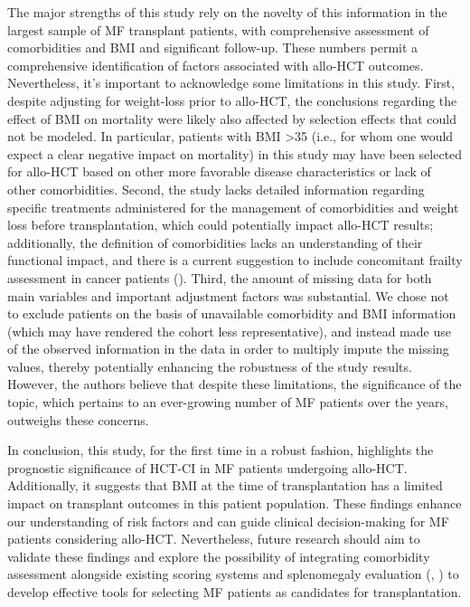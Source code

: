 \documentclass[
  letterpaper,
  paper=240mm:170mm,
  twoside=true,
  open=right,
  fontsize=10pt,
  pagesize=false,
  BCOR=15mm,
  DIV=14,
  headinclude=true,
  footinclude=false,
  headsepline=on]{scrbook}
\begin{document}
The major strengths of this study rely on the novelty of this
information in the largest sample of MF transplant patients, with
comprehensive assessment of comorbidities and BMI and significant
follow-up. These numbers permit a comprehensive identification of
factors associated with allo-HCT outcomes. Nevertheless, it's important
to acknowledge some limitations in this study. First, despite adjusting
for weight-loss prior to allo-HCT, the conclusions regarding the effect
of BMI on mortality were likely also affected by selection effects that
could not be modeled. In particular, patients with BMI \textgreater35
(i.e., for whom one would expect a clear negative impact on mortality)
in this study may have been selected for allo-HCT based on other more
favorable disease characteristics or lack of other comorbidities.
Second, the study lacks detailed information regarding specific
treatments administered for the management of comorbidities and weight
loss before transplantation, which could potentially impact allo-HCT
results; additionally, the definition of comorbidities lacks an
understanding of their functional impact, and there is a current
suggestion to include concomitant frailty assessment in cancer patients
(). Third, the amount of missing data for both main
variables and important adjustment factors was substantial. We chose not
to exclude patients on the basis of unavailable comorbidity and BMI
information (which may have rendered the cohort less representative),
and instead made use of the observed information in the data in order to
multiply impute the missing values, thereby potentially enhancing the
robustness of the study results. However, the authors believe that
despite these limitations, the significance of the topic, which pertains
to an ever-growing number of MF patients over the years, outweighs these
concerns.

In conclusion, this study, for the first time in a robust fashion,
highlights the prognostic significance of HCT-CI in MF patients
undergoing allo-HCT. Additionally, it suggests that BMI at the time of
transplantation has a limited impact on transplant outcomes in this
patient population. These findings enhance our understanding of risk
factors and can guide clinical decision-making for MF patients
considering allo-HCT. Nevertheless, future research should aim to
validate these findings and explore the possibility of integrating
comorbidity assessment alongside existing scoring systems and
splenomegaly evaluation
(,
) to
develop effective tools for selecting MF patients as candidates for
transplantation.
\end{document}
